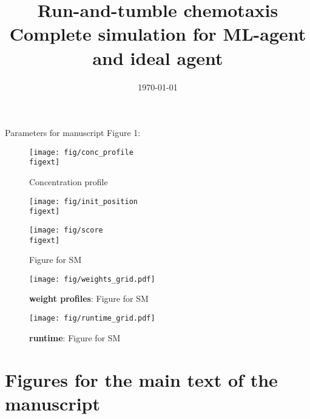 \documentclass{article}
\title{\huge Run-and-tumble chemotaxis \\ \large Complete simulation for ML-agent and ideal agent}
\date{\today}
\begin{document}

\maketitle

\noindent\hrulefill
{}
\noindent\hrulefill


\vfill 
\noindent Parameters for manuscript Figure 1:
\pagebreak
\begin{minipage}{0.55\textwidth}
\begin{figure}[H]
\texttt{[image: fig/conc\_profile\\figext]}
\caption*{Concentration profile}
\end{figure}
\end{minipage}
\begin{minipage}{0.25\textwidth}
\end{minipage}\hfill

\begin{minipage}{0.48\textwidth}
\begin{figure}[H]
\texttt{[image: fig/init\_position\\figext]}
\end{figure}
\end{minipage}
\begin{minipage}{0.48\textwidth}
\begin{figure}[H]
\texttt{[image: fig/score\\figext]}
\caption*{Figure for SM}
\end{figure}
\end{minipage}\hfill

\begin{figure}[H]
\begin{center}
\hspace*{-1cm}\texttt{[image: fig/weights\_grid.pdf]}
\end{center}
\caption*{\textbf{weight profiles}: Figure for SM}
\end{figure}

\begin{figure}[H]
\begin{center}
\hspace*{-1cm}\texttt{[image: fig/runtime\_grid.pdf]}
\end{center}
\caption*{\textbf{runtime}: Figure for SM}
\end{figure}

\pagebreak
\section*{Figures for the main text of the manuscript}
\end{document}
